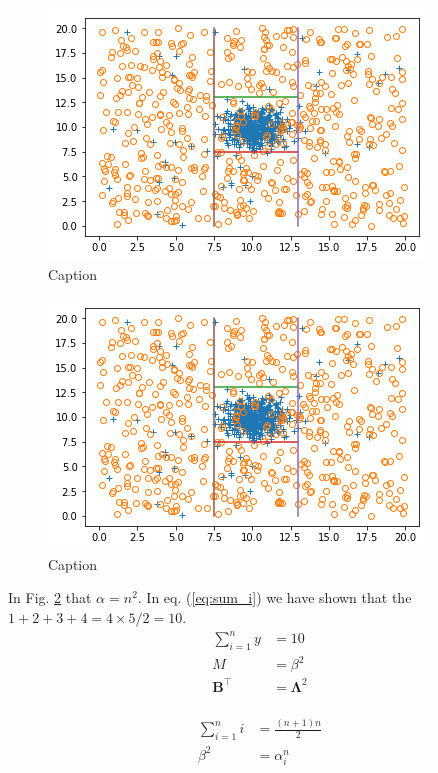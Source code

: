 \documentclass{svproc}
\begin{document}
    \begin{figure}
        \centering
        \includegraphics[scale=.75]{figures/DecisionBoundary.png}
        \caption{Caption}
        \label{fig:fig2}
    \end{figure}

    
    \begin{figure}
        \centering
        \includegraphics[scale=.75]{figures/DecisionBoundary.png}
        \caption{Caption}
        \label{fig:my_label}
    \end{figure}


    
    In Fig. \ref{fig:my_label} that $\alpha = n^2$. In eq. (\ref{eq:sum_i}) we have shown that the $ 1+2+3+4 = 4\times 5 /2=10$.
    \begin{align*}
        \sum_{i=1}^{n} y &= 10 \\
        M &= \beta ^2 \\
        \boldsymbol{B}^\top &= \boldsymbol{\Lambda}^2 \\
    \end{align*}
    
    \begin{align}
        \label{eq:sum_i}
        \sum_{i=1}^n i &= \frac{(n+1)n}{2} \\  
        \nonumber
        \beta ^2 &= \alpha_i^n
    \end{align}
\end{document}

